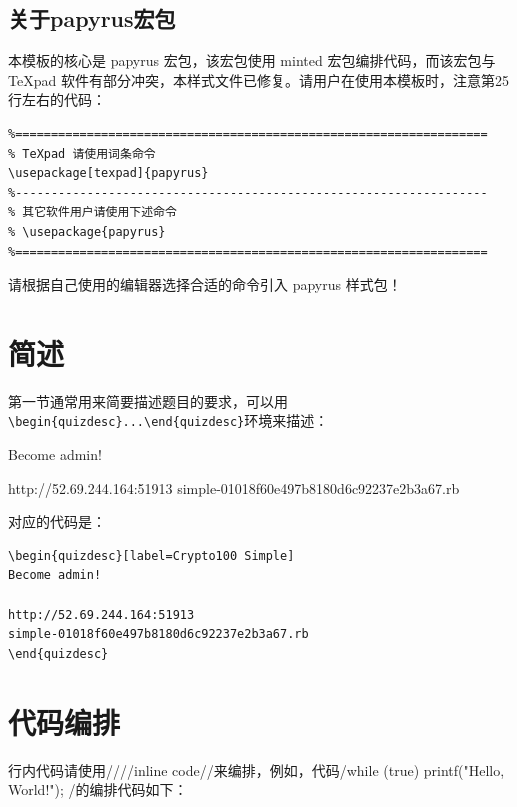 \documentclass[a4paper,UTF8]{ctexart}
\begin{document}
\subsection{关于papyrus宏包}

本模板的核心是 papyrus 宏包，该宏包使用 minted 宏包编排代码，而该宏包与 TeXpad 软件有部分冲突，本样式文件已修复。请用户在使用本模板时，注意第25行左右的代码：

\begin{verbatim}
%==================================================================
% TeXpad 请使用词条命令
\usepackage[texpad]{papyrus}
%------------------------------------------------------------------
% 其它软件用户请使用下述命令
% \usepackage{papyrus}
%==================================================================
\end{verbatim}

请根据自己使用的编辑器选择合适的命令引入 papyrus 样式包！

\section{简述}

第一节通常用来简要描述题目的要求，可以用\verb|\begin{quizdesc}...\end{quizdesc}|环境来描述：\\


\begin{quizdesc}[label=Crypto100 Simple]
Become admin!

http://52.69.244.164:51913
simple-01018f60e497b8180d6c92237e2b3a67.rb
\end{quizdesc}

对应的代码是：

\begin{verbatim}
\begin{quizdesc}[label=Crypto100 Simple]
Become admin!

http://52.69.244.164:51913
simple-01018f60e497b8180d6c92237e2b3a67.rb
\end{quizdesc}
\end{verbatim}

\section{代码编排}

行内代码请使用\code/\code/\slash \code/inline code/\slash 来编排，例如，代码\code/while (true) { printf("Hello, World!\n"); } /的编排代码如下：
\end{document}
